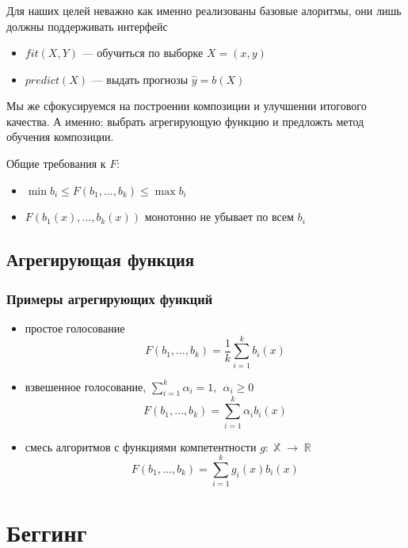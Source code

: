 \documentclass{beamer}
\DeclareMathOperator{\R}{\mathbb{R}}
\DeclareMathOperator{\X}{\mathbb{X}}
\begin{document}
	\begin{frame}
		\frametitle{}
		
		Для наших целей неважно как именно реализованы базовые алоритмы, они лишь должны поддерживать интерфейс
		\begin{itemize}
			\item $fit(X, Y)$ --- обучиться по выборке $X = (x, y)$
			\item $predict(X)$ --- выдать прогнозы $\hat{y} = b(X)$
		\end{itemize}

		\vspace{15pt}

		Мы же сфокусируемся на построении композиции и улучшении итогового качества.
		А именно: выбрать агрегирующую функцию и предложть метод обучения композиции.

		\vspace{15pt}

		Общие требования к $F$:
		\begin{itemize}
			\item $\min b_i \le F(b_1, \dots, b_k) \le \max b_i$
			\item $F(b_1(x), \dots, b_k(x))$ монотонно не убывает по всем $b_i$
		\end{itemize}	
	\end{frame}

	\subsection{Агрегирующая функция}

	\begin{frame}
		\frametitle{Примеры агрегирующих функций}
		\begin{itemize}
			\item простое голосование
			\[
			F(b_1, \dots, b_k) = \frac{1}{k} \sum_{i=1}^{k} b_i(x)
			\]
			\item взвешенное голосование, $\sum_{i=1}^{k} \alpha_i = 1, \hspace{5pt} \alpha_i \ge 0$
			\[
				F(b_1, \dots, b_k) = \sum_{i=1}^{k} \alpha_i b_i(x)
			\]
			\item смесь алгоритмов с функциями компетентности $g : \X \rightarrow \R$
			\[
				F(b_1, \dots, b_k) = \sum_{i=1}^{k} g_i(x) b_i(x)
			\]
		\end{itemize}
	\end{frame}

	\section{Беггинг}
\end{document}
